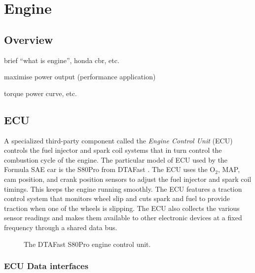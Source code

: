 \section{Engine}

\subsection{Overview}

brief {}``what is engine'', honda cbr, etc.

maximise power output (performance application)

torque power curve, etc.

\subsection{ECU}

A specialized third-party component called the \emph{Engine Control Unit} (ECU) controls the fuel injector and spark coil systems that in turn control the combustion cycle of the engine. The particular model of ECU used by the Formula SAE car is the S80Pro from DTAFast \cite{s80pro}. The ECU uses the O$_{2}$, MAP, cam position, and crank position sensors to adjust the fuel injector and spark coil timings. This keeps the engine running smoothly. The ECU features a traction control system that monitors wheel slip and cuts spark and fuel to provide traction when one of the wheels is slipping. The ECU also collects the various sensor readings and makes them available to other electronic devices at a fixed frequency through a shared data bus. 

\begin{figure}[H]
\centering
\caption{The DTAFast S80Pro engine control unit.}
\label{fig:s80pro_product}
\end{figure}

\subsubsection{ECU Data interfaces\label{sec:background_ecu_data_interfaces}}

